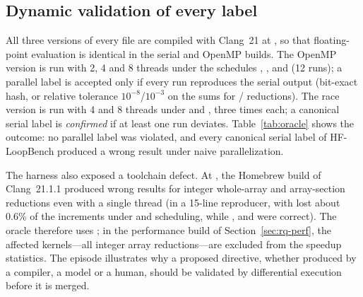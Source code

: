 

\subsection{Dynamic validation of every label}
\label{sec:oracle}
All three versions of every file are compiled with Clang~21 at , so that floating-point evaluation is identical in the serial and OpenMP builds. The OpenMP version is run with 2, 4 and 8 threads under the schedules , ,  and  (12 runs); a parallel label is accepted only if every run reproduces the serial output (bit-exact hash, or relative tolerance $10^{-8}$/$10^{-3}$ on the sums for / reductions). The race version is run with 4 and 8 threads under  and , three times each; a canonical serial label is \emph{confirmed} if at least one run deviates. Table~\ref{tab:oracle} shows the outcome: no parallel label was violated, and every canonical serial label of HF-LoopBench produced a wrong result under naive parallelization.



The harness also exposed a toolchain defect. At , the Homebrew build of Clang~21.1.1 produced wrong results for integer whole-array and array-section reductions even with a single thread (in a 15-line reproducer,  with  lost about 0.6\% of the increments under  and  scheduling, while ,  and  were correct). The oracle therefore uses ; in the  performance build of Section~\ref{sec:rq-perf}, the \nPerfMismatch{} affected kernels---all integer array reductions---are excluded from the speedup statistics. The episode illustrates why a proposed directive, whether produced by a compiler, a model or a human, should be validated by differential execution before it is merged.

